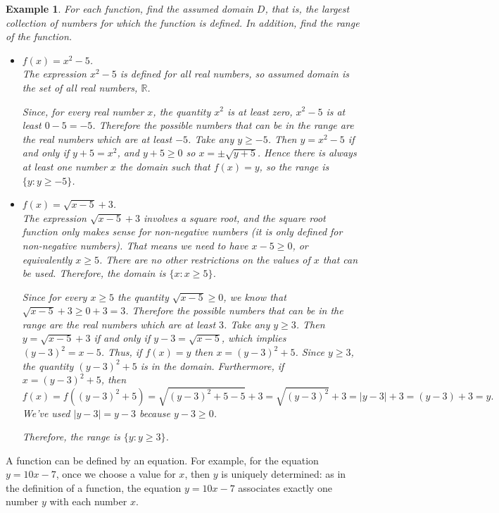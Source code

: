 \documentclass[11pt]{book}               %
\newtheorem{example}{Example}
\begin{document}
\begin{example}
\normalfont For each function, find the assumed domain $D$, that is, the largest collection of numbers for which the function is defined.  In addition, find the range of the function.
\begin{itemize}
 \item $ f(x) = x^2 -5$.\\
The expression $x^2 - 5$ is defined for all real numbers, so assumed domain is the set of all real numbers, $\mathbb{R}$. 

Since, for every real number $x$, the quantity $x^2$ is at least zero, 
$x^2-5$ is at least $0-5 = -5$. 
Therefore the possible numbers that can be in the range are the real numbers which are at least $-5$.  
Take any $y \geq -5$.  Then 
$y = x^2 - 5$ if and only if $y+5 = x^2$, and $y + 5 \geq 0$ so $x = \pm \sqrt{y + 5}$.
Hence there is always at least one number $x$ the domain such that $f(x) = y$, 
so  the range is $ \{ y : y \geq -5 \} $.

\item $f(x) = \sqrt{x-5} + 3 $.\\
The expression $\sqrt{x-5} + 3 $ involves a square root, and the square root function 
only makes sense for non-negative numbers (it is only defined for non-negative numbers).
That means we need to have $x -5 \geq 0$, or equivalently $x \geq 5$.
There are no other restrictions on the values of $x$ that can be used.
Therefore, the domain is 
$ \{ x : x \geq 5\} $. 

Since for every $x \geq 5$ the quantity $\sqrt{x-5} \geq 0$,
we know that $\sqrt{x-5} + 3 \geq 0+3 = 3$.
Therefore the possible numbers that can be in the range are the real numbers which are at least $3$.  
Take any $y \geq 3$.
Then $y = \sqrt{x-5} + 3$ if and only if $y - 3 = \sqrt{x-5}$, which implies $(y-3)^2 = x-5$.
Thus, if $f(x) = y$ then $x = (y-3)^2 + 5$.
Since $y \geq 3$, the quantity $(y-3)^2 + 5$ is in the domain.
Furthermore, if $x = (y-3)^2 + 5$, then 
$$f(x) = f((y-3)^2 + 5) = \sqrt{(y-3)^2 + 5 -5} + 3 = \sqrt{(y-3)^2} + 3 = |y-3| + 3  = (y-3) + 3 = y.$$
We've used $|y-3| = y-3$ because $y - 3 \geq 0$. 

Therefore,  the range is $ \{ y : y \geq 3 \} $.
 
\end{itemize}
\end{example}

A function can be defined by an equation.  
For example, for the equation $y = 10x - 7$, once we choose a value for $x$, then 
$y$ is uniquely determined:
as in the definition of a function, the equation $y = 10x - 7$ associates exactly one number $y$ with 
each number $x$.
\end{document}
